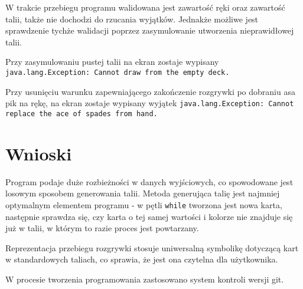\documentclass{article}
\begin{document}
W trakcie przebiegu programu walidowana jest zawartość ręki oraz zawartość talii, także nie dochodzi do rzucania wyjątków. Jednakże możliwe jest sprawdzenie tychże walidacji poprzez zasymulowanie utworzenia nieprawidłowej talii. 

Przy zasymulowaniu pustej talii na ekran zostaje wypisany \break \texttt{java.lang.Exception: Cannot draw from the empty deck.}

Przy usunięciu warunku zapewniającego zakończenie rozgrywki po dobraniu asa pik na rękę, na ekran zostaje wypisany wyjątek \texttt{java.lang.Exception: Cannot replace the ace of spades from hand.}

\section{Wnioski}

Program podaje duże rozbieżności w danych wyjściowych, co spowodowane jest losowym sposobem generowania talii. Metoda generująca talię jest najmniej optymalnym elementem programu - w pętli \texttt{while} tworzona jest nowa karta, następnie sprawdza się, czy karta o tej samej wartości i kolorze nie znajduje się już w talii, w którym to razie proces jest powtarzany.

Reprezentacja przebiegu rozgrywki stosuje uniwersalną symbolikę dotyczącą kart w standardowych taliach, co sprawia, że jest ona czytelna dla użytkownika.

W procesie tworzenia programowania zastosowano system kontroli wersji git. 



\end{document}
